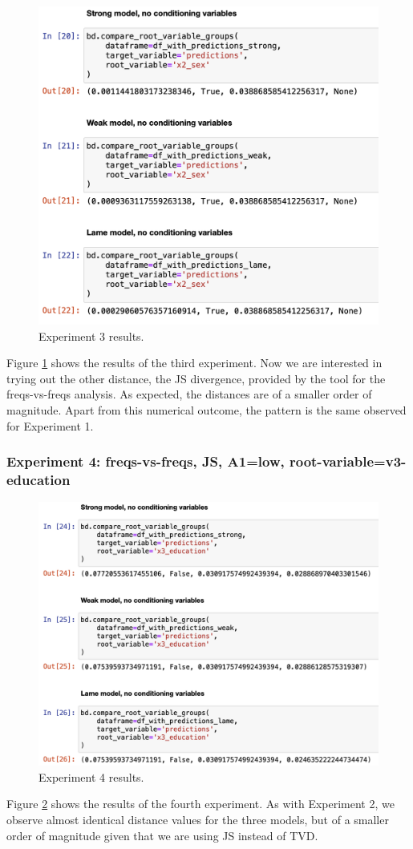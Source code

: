 \documentclass[
]{ceurart}
\begin{document}
\begin{figure}[h!]
  \includegraphics[width=.8\linewidth, left]{exp3.png}
  \caption{Experiment 3 results.}
  \label{fig:exp3}
\end{figure}
Figure \ref{fig:exp3} shows the results of the third experiment. Now we are interested in trying out the other distance, the JS divergence, provided by the tool for the freqs-vs-freqs analysis. As expected, the distances are of a smaller order of magnitude. Apart from this numerical outcome, the pattern is the same observed for Experiment 1. 

\subsubsection{Experiment 4: freqs-vs-freqs, JS, A1=low, root-variable=v3-education}

\begin{figure}[h!]
  \includegraphics[width=.8\linewidth, left]{exp4.png}
  \caption{Experiment 4 results.}
  \label{fig:exp4}
\end{figure}
Figure \ref{fig:exp4} shows the results of the fourth experiment. As with Experiment 2, we observe almost identical distance values for the three models, but of a smaller order of magnitude given that we are using JS instead of TVD. 
\end{document}
